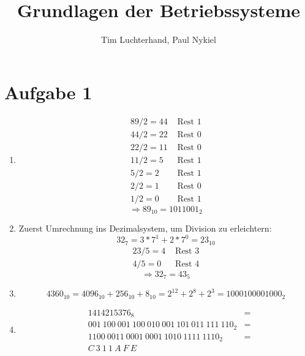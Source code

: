 \documentclass{scrreprt}
\title{Grundlagen der Betriebssysteme}
\author{Tim Luchterhand, Paul Nykiel}
\begin{document}
    \maketitle
    \section{Aufgabe 1}
    \begin{enumerate}[label = (\alph*)]
        \item 
            \begin{align*}
                89 / 2  =  44 & \text{ Rest } 1 \\
                44 / 2  =  22 & \text{ Rest } 0 \\
                22 / 2  =  11 & \text{ Rest } 0 \\
                11 / 2  =  5  & \text{ Rest } 1 \\
                5 / 2  =  2 & \text{ Rest } 1 \\
                2 /2  =  1 & \text{ Rest } 0 \\
                1 / 2  =  0 & \text{ Rest } 1 
            \end{align*}
            \begin{equation*}
                \Rightarrow {89}_{10} = {1011001}_2
            \end{equation*}
        \item
            Zuerst Umrechnung ins Dezimalsystem, um Division zu erleichtern:
            \begin{equation*}
                {32}_7 =  3 * 7^1 + 2  * 7^0  = {23}_{10} 
            \end{equation*}
            \begin{align*}
                23 / 5 =  4 & \text{ Rest } 3\\
                4 / 5 =  0 & \text{ Rest } 4
            \end{align*}
            \begin{equation*}
                \Rightarrow  {32}_7 = {43}_5
            \end{equation*}
        \item
            \begin{equation*}
                {4360}_{10} = {4096}_{10} + {256}_{10} + 8_{10} = 2^{12} + 2^{8} + 2^{3} = {1000100001000}_2
            \end{equation*}
        \item
            \begin{eqnarray*}
                & {1414215376}_8 & = \\
                & {001\ 100\ 001\ 100\ 010\ 001\ 101\ 011\ 111\ 110}_2 & = \\
                & {1100\ 0011\ 0001\ 0001\ 1010\ 1111\ 1110}_2 & = \\
                & {C\ 3\ 1\ 1\ A\ F\ E} &
            \end{eqnarray*}
    \end{enumerate}
\end{document}
